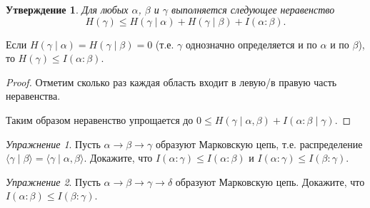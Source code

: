 \documentclass[12pt]{article}
\theoremstyle{definition}
\theoremstyle{plain}
\newtheorem{statement}{Утверждение}[section]
\theoremstyle{remark}
\newtheorem{exercise}{Упражнение}[section]
\begin{document}
\begin{statement}\label{st:someentropyineq}
    Для любых $\alpha$, $\beta$ и $\gamma$ выполняется следующее неравенство 
    \[
        H(\gamma)\le H(\gamma\mid\alpha) + H(\gamma\mid\beta) + I(\alpha:\beta).
    \]
\end{statement}
Если $H(\gamma\mid\alpha) = H(\gamma\mid\beta) = 0$ 
(т.е. $\gamma$ однозначно определяется и по $\alpha$ и по $\beta$), 
то $H(\gamma)\le I(\alpha:\beta)$.
\begin{proof}
    Отметим сколько раз каждая область входит в левую/в правую часть неравенства.
    \begin{center}
    \end{center}
    Таким образом неравенство упрощается до $0\le H(\gamma\mid\alpha,\beta) +
    I(\alpha:\beta\mid\gamma)$.
\end{proof}
\begin{exercise}
    Пусть $\alpha\to\beta\to\gamma$ образуют Марковскую цепь, т.е. распределение 
    $\langle\gamma\mid\beta\rangle = \langle\gamma\mid\alpha,\beta\rangle$.
    Докажите, что $I(\alpha:\gamma) \le I(\alpha:\beta)$ и $I(\alpha:\gamma) \le I(\beta:\gamma)$.
\end{exercise}
\begin{exercise}
    Пусть $\alpha\to\beta\to\gamma\to\delta$ образуют Марковскую цепь.
    Докажите, что $I(\alpha:\beta) \le I(\beta:\gamma)$.
\end{exercise}
\end{document}
